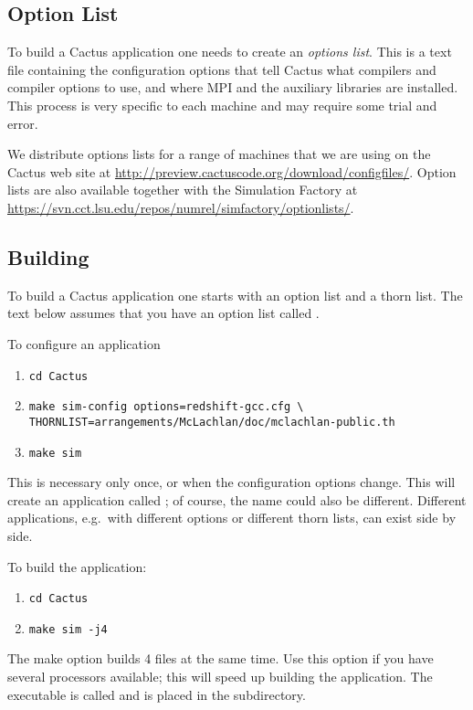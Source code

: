 \subsection{Option List}

To build a Cactus application one needs to create an \emph{options
  list}.  This is a text file containing the configuration options
that tell Cactus what compilers and compiler options to use, and where
MPI and the auxiliary libraries are installed.  This process is very
specific to each machine and may require some trial and error.

We distribute options lists for a range of machines that we are using
on the Cactus web site at
\url{http://preview.cactuscode.org/download/configfiles/}.  Option
lists are also available together with the Simulation Factory
\cite{ES-simfactoryweb} at
\url{https://svn.cct.lsu.edu/repos/numrel/simfactory/optionlists/}.

\subsection{Building}

To build a Cactus application one starts with an option list and a
thorn list.  The text below assumes that you have an option list
called .

To configure an application
\begin{enumerate}
\item\verb+cd Cactus+
\item\verb+make sim-config options=redshift-gcc.cfg \+\\
  \verb+THORNLIST=arrangements/McLachlan/doc/mclachlan-public.th+
\item\verb+make sim+
\end{enumerate}
This is necessary only once, or when the configuration options change.
This will create an application called ; of course, the name
could also be different.  Different applications, e.g.\ with different
options or different thorn lists, can exist side by side.

To build the application:
\begin{enumerate}
\item\verb+cd Cactus+
\item\verb+make sim -j4+
\end{enumerate}
The make option  builds 4 files at the same time.  Use this
option if you have several processors available; this will speed up
building the application.  The executable is called 
and is placed in the  subdirectory.

